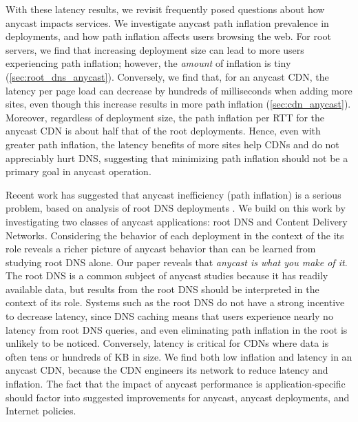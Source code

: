 \documentclass[sigconf,letterpaper,nonacm,10pt,anonymous]{acmart}
\begin{document}
With these latency results, we revisit frequently posed questions about
how anycast impacts services. We investigate anycast path inflation
prevalence in deployments, and how path inflation affects users browsing
the web. For root servers, we find that increasing deployment size can
lead to more users experiencing path inflation; however, the
\emph{amount} of inflation is tiny (\cref{sec:root_dns_anycast}).
Conversely, we find that, for an anycast CDN, the latency per page load
can decrease by hundreds of milliseconds when adding more sites, even
though this increase results in more path inflation
(\cref{sec:cdn_anycast}). Moreover, regardless of deployment size, the
path inflation per RTT for the anycast CDN is about half that of the
root deployments. Hence, even with greater path inflation, the latency
benefits of more sites help CDNs and do not appreciably hurt DNS,
suggesting that minimizing path inflation should not be a primary goal
in anycast operation.

Recent work has suggested that anycast inefficiency (path inflation) is
a serious problem, based on analysis of root DNS deployments
\cite{li_levin_spring_bhattacharjee_2018}. We build on this work by
investigating two classes of anycast applications: root DNS and Content
Delivery Networks. Considering the behavior of each deployment in the
context of the its role reveals a richer picture of anycast behavior
than can be learned from studying root DNS alone. Our paper reveals that
\emph{anycast is what you make of it}. The root DNS is a common subject
of anycast studies because it has readily available data, but results
from the root DNS should be interpreted in the context of its role.
Systems such as the root DNS do not have a strong incentive to decrease
latency, since DNS caching means that users experience nearly no latency
from root DNS queries, and even eliminating path inflation in the root
is unlikely to be noticed. Conversely, latency is critical for CDNs
where data is often tens or hundreds of KB in size. We find both low
inflation and latency in an anycast CDN, because the CDN engineers its
network to reduce latency and inflation. The fact that the impact of
anycast performance is application-specific should factor into suggested
improvements for anycast, anycast deployments, and Internet policies.
\end{document}
